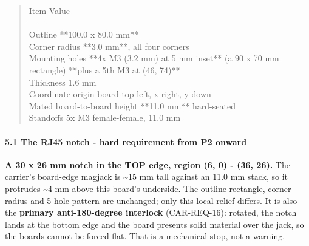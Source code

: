 \documentclass[11pt,a4paper]{article}
\begin{document}
\begin{quote}\small\ttfamily\raggedright
\textbar{} Item \textbar{} Value \textbar{}\\
\textbar{}---\textbar{}---\textbar{}\\
\textbar{} Outline \textbar{} {*}{*}100.0 x 80.0 mm{*}{*} \textbar{}\\
\textbar{} Corner radius \textbar{} {*}{*}3.0 mm{*}{*}, all four corners \textbar{}\\
\textbar{} Mounting holes \textbar{} {*}{*}4x M3 (3.2 mm) at 5 mm inset{*}{*} (a 90 x 70 mm rectangle) {*}{*}plus a 5th M3 at (46, 74){*}{*} \textbar{}\\
\textbar{} Thickness \textbar{} 1.6 mm \textbar{}\\
\textbar{} Coordinate origin \textbar{} board top-left, x right, y down \textbar{}\\
\textbar{} Mated board-to-board height \textbar{} {*}{*}11.0 mm{*}{*} hard-seated \textbar{}\\
\textbar{} Standoffs \textbar{} 5x M3 female-female, 11.0 mm \textbar{}
\end{quote}
\paragraph*{5.1 The RJ45 notch - hard requirement from P2 onward}
\textbf{A 30 x 26 mm notch in the TOP edge, region (6, 0) - (36, 26).} The carrier's board-edge magjack is \textasciitilde{}15 mm tall against an 11.0 mm stack, so it protrudes \textasciitilde{}4 mm above this board's underside. The outline rectangle, corner radius and 5-hole pattern are unchanged; only this local relief differs. It is also the \textbf{primary anti-180-degree interlock} (CAR-REQ-16): rotated, the notch lands at the bottom edge and the board presents solid material over the jack, so the boards cannot be forced flat. That is a mechanical stop, not a warning.
\end{document}
